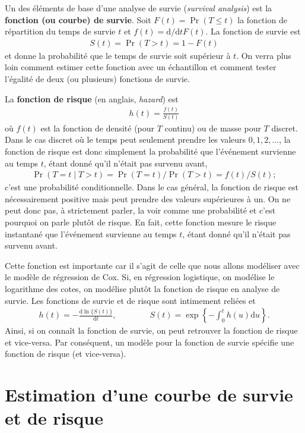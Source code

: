 \documentclass[
  11pt,
  letterpaper,
]{scrbook}
\theoremstyle{definition}
\theoremstyle{remark}
\begin{document}
Un des éléments de base d'une analyse de survie (\emph{survival
analysis}) est la \textbf{fonction (ou courbe) de survie}. Soit
\(F(t)=\Pr(T \leq t)\) la fonction de répartition du temps de survie
\(t\) et \(f(t) = \mathrm{d} / \mathrm{d} t F(t)\). La fonction de
survie est \begin{align*}
S(t)= \Pr(T > t) = 1-F(t)
\end{align*} et donne la probabilité que le temps de survie soit
supérieur à \(t\). On verra plus loin comment estimer cette fonction
avec un échantillon et comment tester l'égalité de deux (ou plusieurs)
fonctions de survie.

La \textbf{fonction de risque} (en anglais, \emph{hazard}) est
\begin{align*}
h(t) =  \frac{f(t)}{S(t)}
\end{align*} où \(f(t)\) est la fonction de densité (pour \(T\) continu)
ou de masse pour \(T\) discret. Dans le cas discret où le temps peut
seulement prendre les valeurs \(0, 1, 2, \ldots\), la fonction de risque
est donc simplement la probabilité que l'événement survienne au temps
\(t\), étant donné qu'il n'était pas survenu avant, \begin{align*}
\Pr(T=t \mid T > t) = \Pr(T=t) / \Pr(T >t) = f(t)/S(t);
\end{align*} c'est une probabilité conditionnelle. Dans le cas général,
la fonction de risque est nécessairement positive mais peut prendre des
valeurs supérieures à un. On ne peut donc pas, à strictement parler, la
voir comme une probabilité et c'est pourquoi on parle plutôt de risque.
En fait, cette fonction mesure le risque instantané que l'événement
survienne au temps \(t\), étant donné qu'il n'était pas survenu avant.

Cette fonction est importante car il s'agit de celle que nous allons
modéliser avec le modèle de régression de Cox. Si, en régression
logistique, on modélise le logarithme des cotes, on modélise plutôt la
fonction de risque en analyse de survie. Les fonctions de survie et de
risque sont intimement reliées et \begin{align*}
h(t) = - \frac{\mathrm{d} \ln\{S(t)\}}{\mathrm{d} t}, \qquad \qquad S(t) = \exp \left\{ -\int_0^t h(u) \mathrm{d} u\right\}.
\end{align*} Ainsi, si on connaît la fonction de survie, on peut
retrouver la fonction de risque et vice-versa. Par conséquent, un modèle
pour la fonction de survie spécifie une fonction de risque (et
vice-versa).

\hypertarget{estimation-dune-courbe-de-survie-et-de-risque}{%
\section{Estimation d'une courbe de survie et de
risque}\label{estimation-dune-courbe-de-survie-et-de-risque}}
\end{document}
